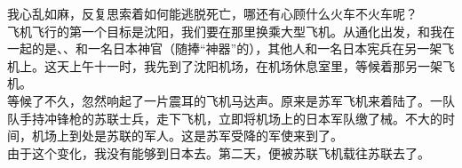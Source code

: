 我心乱如麻，反复思索着如何能逃脱死亡，哪还有心顾什么火车不火车呢？\\

飞机飞行的第一个目标是沈阳，我们要在那里换乘大型飞机。从通化出发，和我在一起的是、、和一名日本神官（随捧“神器”的），其他人和一名日本宪兵在另一架飞机上。这天上午十一时，我先到了沈阳机场，在机场休息室里，等候着那另一架飞机。\\

等候了不久，忽然响起了一片震耳的飞机马达声。原来是苏军飞机来着陆了。一队队手持冲锋枪的苏联士兵，走下飞机，立即将机场上的日本军队缴了械。不大的时间，机场上到处是苏联的军人。这是苏军受降的军使来到了。\\

由于这个变化，我没有能够到日本去。第二天，便被苏联飞机载往苏联去了。
